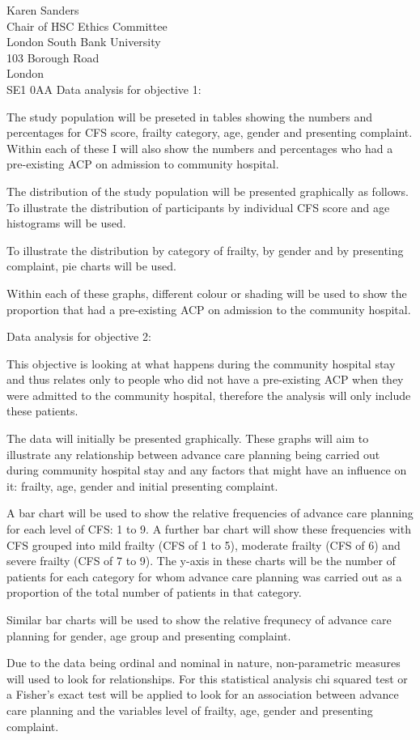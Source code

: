 \documentclass
[
	12pt,
	a4paper,
	oneside
]{letter}
\begin{document}
\begin{letter}{Karen Sanders\\
		Chair of HSC Ethics Committee\\
		London South Bank University\\
		103 Borough Road\\
		London\\
		SE1 0AA}
Data analysis for objective 1: 

The study population will be preseted in tables showing the numbers and percentages
for CFS score, frailty category, age, gender and presenting complaint. Within each
of these I will also show the numbers and percentages who had a pre-existing ACP
on admission to community hospital.

The distribution of the study population will be presented graphically as follows.
To illustrate the distribution of participants by individual CFS score and age
histograms will be used. 

To illustrate the distribution by category of frailty, by gender and by presenting 
complaint, pie charts will be used.

Within each of these graphs, different colour or shading will be used to show
the proportion that had a pre-existing ACP on admission to the community hospital.

Data analysis for objective 2:

This objective is looking at what happens during the community hospital stay and 
thus relates only to people who did not have a pre-existing ACP when they
were admitted to the community hospital, therefore the analysis will only include these 
patients.

The data will initially be presented graphically. These graphs will aim to illustrate
any relationship between advance care planning being carried out during community
hospital stay and any factors that might have an 
influence on it: 
frailty, age, gender and initial presenting complaint.

A bar chart will be used to show the relative frequencies of advance care planning
for each level of CFS: 1 to 9. A further bar chart will show these frequencies with
CFS grouped into mild frailty (CFS of 1 to 5), moderate frailty (CFS of 6) and severe
frailty (CFS of 7 to 9). The y-axis in these charts will be the number of patients
for each category for whom advance care planning was carried out as a proportion of
the total number of patients in that category.  

Similar bar charts will be used to show the relative frequnecy of advance care
planning for gender, age group and presenting complaint.

Due to the data being ordinal and nominal in nature, non-parametric measures will
used to look for relationships. For this statistical analysis chi squared 
test or a Fisher's exact test will be applied to look for an association 
between advance care planning and the variables level of frailty, age, gender and 
presenting complaint.


\end{letter}
\end{document}
